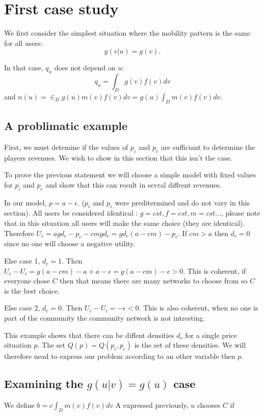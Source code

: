 \documentclass{article}
\begin{document}
 
\section{First case study}
 
 We first consider the simplest situation where the mobility pattern is the same for all users:
 $$ g(v|u)=g(v).$$

In that case, $q_u$ does not depend on $u$:
$$
q_u=\int_D g(v) f(v) dv $$
and $n(u)=\in_D g(u) m(v) f(v) dv = g(u) \int_D m(v) f(v) dv.$

\subsection{A problimatic example}
First, we must detemine if the values of $p_i$ and $p_c$ are sufficiant to determine the players revenues. We wish to show in this section that this isn't the case.

To prove the previous statement we will choose a simple model with fixed values for $p_i$ and $p_c$ and show that this can result in sevral diffrent revenues.


In our model, $p = a -\epsilon$. ($p_i$ and $p_c$ were preditermined and do not vary in this section). All users be considered identical : $g=cst, f=cst, m=cst ...$,
 please note that in this situation all users will make the same choice (they are identical). Therefore $U_c = a g d_c -p_c -c m g d_c = g d_c (a-cm) -p_c.$
If $cm > a$ then $d_c = 0$ since no one will choose a negative utility.

Else case 1, $d_c = 1$.
Then $U_c -U_i = g (a - cm) - a + a - \epsilon = g (a -cm) - \epsilon> 0$. This is coherent, if everyone chose $C$ then that means there are many networks to choose from so $C$ is the best choice.

Else case 2, $d_c = 0$.
Then $U_c - U_i = -\epsilon < 0$. This is also coherent, when no one is part of the community the community network is not intresting.


This example shows that there can be diffent densities $d_c$ for a single price situation $p$. The set $Q(p)= Q(p_i,p_c)$ is the set of these densities. We will therefore nead to express our problem according to an other variable then $p$.

\subsection{Examining the $g(u|v) = g(u)$ case}
We define $b = c \int_D m(v) f(v) dv$
A expressed previously, $u$ chooses $C$ if
\end{document}
